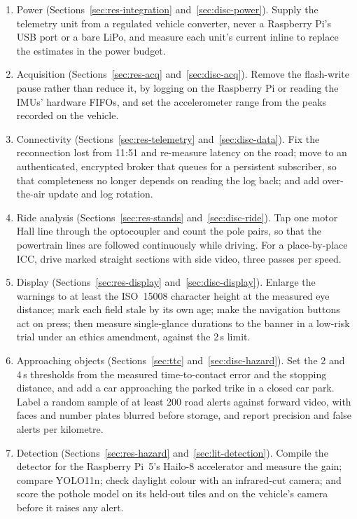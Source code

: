 \begin{enumerate}
\item Power (Sections~\ref{sec:res-integration} and~\ref{sec:disc-power}). Supply the telemetry unit from a regulated vehicle converter, never a Raspberry Pi's USB port or a bare LiPo, and measure each unit's current inline to replace the estimates in the power budget.
\item Acquisition (Sections~\ref{sec:res-acq} and~\ref{sec:disc-acq}). Remove the flash-write pause rather than reduce it, by logging on the Raspberry Pi or reading the IMUs' hardware FIFOs, and set the accelerometer range from the peaks recorded on the vehicle.
\item Connectivity (Sections~\ref{sec:res-telemetry} and~\ref{sec:disc-data}). Fix the reconnection lost from 11:51 and re-measure latency on the road; move to an authenticated, encrypted broker that queues for a persistent subscriber, so that completeness no longer depends on reading the log back; and add over-the-air update and log rotation.
\item Ride analysis (Sections~\ref{sec:res-stands} and~\ref{sec:disc-ride}). Tap one motor Hall line through the optocoupler and count the pole pairs, so that the powertrain lines are followed continuously while driving. For a place-by-place ICC, drive marked straight sections with side video, three passes per speed.
\item Display (Sections~\ref{sec:res-display} and~\ref{sec:disc-display}). Enlarge the warnings to at least the ISO~15008 character height at the measured eye distance; mark each field stale by its own age; make the navigation buttons act on press; then measure single-glance durations to the banner in a low-risk trial under an ethics amendment, against the 2\,s limit.
\item Approaching objects (Sections~\ref{sec:ttc} and~\ref{sec:disc-hazard}). Set the 2 and 4\,s thresholds from the measured time-to-contact error and the stopping distance, and add a car approaching the parked trike in a closed car park. Label a random sample of at least 200 road alerts against forward video, with faces and number plates blurred before storage, and report precision and false alerts per kilometre.
\item Detection (Sections~\ref{sec:res-hazard} and~\ref{sec:lit-detection}). Compile the detector for the Raspberry Pi~5's Hailo-8 accelerator and measure the gain; compare YOLO11n; check daylight colour with an infrared-cut camera; and score the pothole model on its held-out tiles and on the vehicle's camera before it raises any alert.

\end{enumerate}
